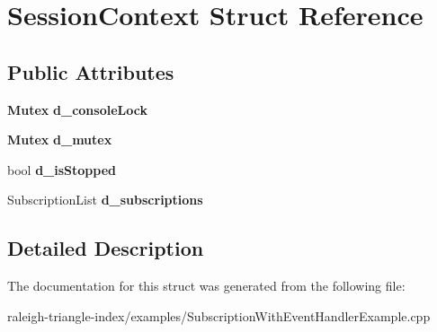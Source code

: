 \section{Session\+Context Struct Reference}
\label{struct_session_context}
\subsection*{Public Attributes}
\begin{DoxyCompactItemize}
\item 
{\bf Mutex} {\bfseries d\+\_\+console\+Lock}\label{struct_session_context_a25709be2c1f099ec19736f5a29eab867}

\item 
{\bf Mutex} {\bfseries d\+\_\+mutex}\label{struct_session_context_a4a24a16ebeb54d3dc1655d2a4af50770}

\item 
bool {\bfseries d\+\_\+is\+Stopped}\label{struct_session_context_a8321cad798024b2c3e51aa7a8c755b47}

\item 
Subscription\+List {\bfseries d\+\_\+subscriptions}\label{struct_session_context_a402f225bad076712bc6b29b04b7deb09}

\end{DoxyCompactItemize}


\subsection{Detailed Description}


The documentation for this struct was generated from the following file\+:\begin{DoxyCompactItemize}
\item 
raleigh-\/triangle-\/index/examples/Subscription\+With\+Event\+Handler\+Example.\+cpp\end{DoxyCompactItemize}
